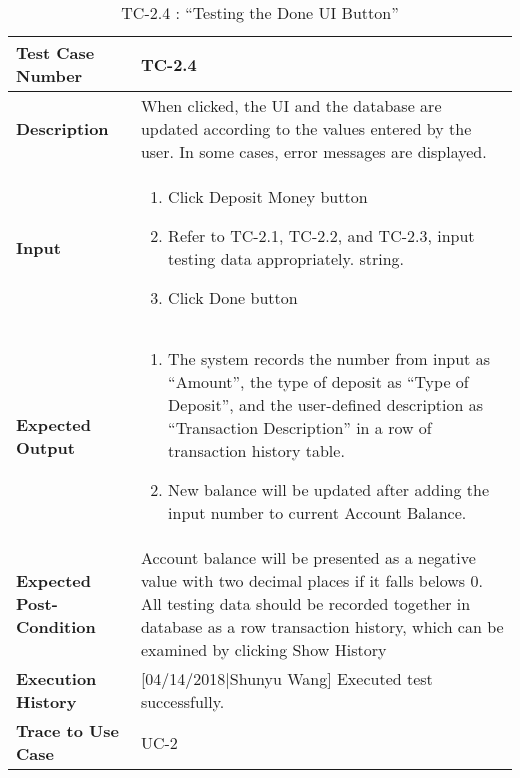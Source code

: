 \documentclass[12pt]{article}
\begin{document}
\begin{table}[H]
\caption{TC-2.4 : “Testing the Done UI Button”}
\begin{center}
\begin{tabular}{|p{5	cm}|p{12cm}|}
\hline
\bf Test Case Number & 
TC-2.4 \\
\hline
\bf Description & 
When clicked, the UI and the database are updated according to the values entered by the user. In some cases, error messages are displayed.\\
\hline
\bf Input & 
\begin{enumerate}
  \item Click Deposit Money button
  \item Refer to TC-2.1, TC-2.2, and TC-2.3, input testing data appropriately. string.
  \item Click Done button
\end{enumerate} \\
\hline
\bf Expected Output & 
\begin{enumerate}
  \item The system records the number from input as “Amount”, the type of deposit as “Type of Deposit”, and the user-defined description as “Transaction Description” in a row of transaction history table.
  \item New balance will be updated after adding the input number to current Account Balance.
\end{enumerate} \\
\hline
\bf Expected Post-Condition & 
Account balance will be presented as a negative value with two decimal places if it falls belows 0. All testing data should be recorded together  in database as a row transaction history, which can be examined by clicking Show History\\
\hline
\bf Execution History & 
[04/14/2018|Shunyu Wang] Executed test successfully.\\
\hline
\bf Trace to Use Case & 
UC-2\\
\hline

\end{tabular}
\end{center}
\end{table}
\end{document}
